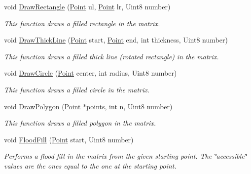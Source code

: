 \begin{DoxyCompactItemize}
void \hyperlink{classMatrix_a55977ba3ee91f352759f446a5092ea23}{DrawRectangle} (\hyperlink{structMatrix_1_1Point}{Point} ul, \hyperlink{structMatrix_1_1Point}{Point} lr, Uint8 number)
\begin{DoxyCompactList}\small\item\em This function draws a filled rectangle in the matrix. \item\end{DoxyCompactList}\item 
void \hyperlink{classMatrix_a8aecf2d42e65b27f051c8af79aeeb467}{DrawThickLine} (\hyperlink{structMatrix_1_1Point}{Point} start, \hyperlink{structMatrix_1_1Point}{Point} end, int thickness, Uint8 number)
\begin{DoxyCompactList}\small\item\em This function draws a filled thick line (rotated rectangle) in the matrix. \item\end{DoxyCompactList}\item 
void \hyperlink{classMatrix_a9dd7af97fcc825ca07a64b28050cb44f}{DrawCircle} (\hyperlink{structMatrix_1_1Point}{Point} center, int radius, Uint8 number)
\begin{DoxyCompactList}\small\item\em This function draws a filled circle in the matrix. \item\end{DoxyCompactList}\item 
void \hyperlink{classMatrix_a3b2f9c59a4cc8da933de12f4ccb867f6}{DrawPolygon} (\hyperlink{structMatrix_1_1Point}{Point} $\ast$points, int n, Uint8 number)
\begin{DoxyCompactList}\small\item\em This function draws a filled polygon in the matrix. \item\end{DoxyCompactList}\item 
void \hyperlink{classMatrix_a7209ed0123ff3686f0d0f7f4e6ac7094}{FloodFill} (\hyperlink{structMatrix_1_1Point}{Point} start, Uint8 number)
\begin{DoxyCompactList}\small\item\em Performs a flood fill in the matrix from the given starting point. The \char`\"{}accessible\char`\"{} values are the ones equal to the one at the starting point. \item\end{DoxyCompactList}\end{DoxyCompactItemize}
